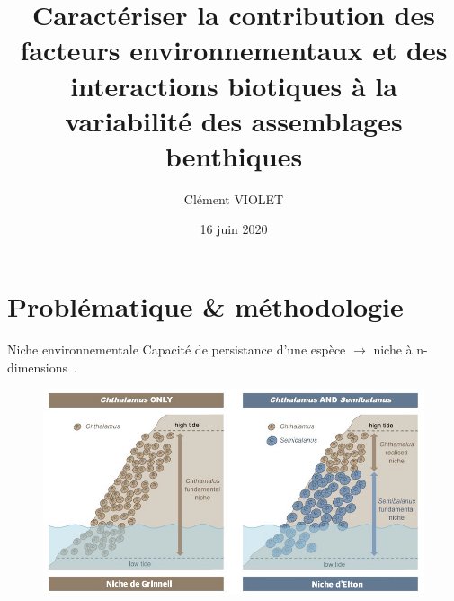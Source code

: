 \documentclass[%
]{beamer}
\title{Caractériser la contribution des facteurs environnementaux et des interactions biotiques à la variabilité des assemblages benthiques}
\date{16 juin 2020}
\author{Clément VIOLET}
\institute{Université de Rennes 1 \par Laboratoire d'Ecologie Benthique Cotière}
\begin{document}
  \maketitle
  
  \section{Problématique \& méthodologie}

  \begin{frame}{Niche environnementale}
	Capacité de persistance d'une espèce $\rightarrow$ niche à n-dimensions~\citep{Hutchinson_1957}.\\\vspace{2\baselineskip}
	\pause
	\begin{figure}[t]
		\begin{center}
			\includegraphics[scale = 0.43]{figs/barnacle1_med.png}
		\end{center}
	\end{figure}
	\end{frame}
	
\end{document}
